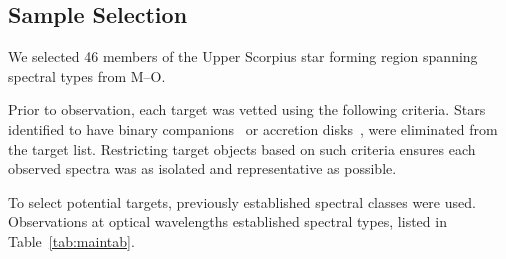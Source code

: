 \subsection{Sample Selection}\label{sec:sampsel}


We selected 46 members of the Upper Scorpius star forming region spanning spectral types from M--O.



Prior to observation, each target was vetted using the following criteria. 
Stars identified to have binary companions~\cite{binary_guy} or accretion 
disks~\cite{binary_guy}, were eliminated from the target list.  
Restricting target objects based on such criteria ensures each observed 
spectra was as isolated and representative as possible.



To select potential targets, previously established spectral classes 
were used.  
Observations at optical wavelengths established 
spectral types, listed in Table~\ref{tab:maintab}.  











